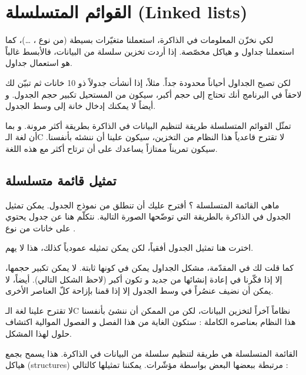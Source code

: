 \chapter{القوائم المتسلسلة (\textenglish{Linked lists})}

لكي نخزّن المعلومات في الذاكرة، استعملنا متغيّرات بسيطة (من نوع
،  \dots)،
كما استعملنا جداول و هياكل مخصّصة. إذا أردت تخزين سلسلة من البيانات، فالأبسط غالباً هو استعمال جداول. 

لكن تصبح الجداول أحياناً محدودة جداً. مثلاً، إذا أنشأت جدولاً ذو 10 خانات ثم تبيّن لك لاحقاً في البرنامج أنك تحتاج إلى حجم أكبر، سيكون من المستحيل تكبير حجم الجدول. و أيضاً لا يمكنك إدخال خانة إلى وسط الجدول.

تمثّل القوائم المتسلسلة طريقة لتنظيم البيانات في الذاكرة بطريقة أكثر مرونة. و بما أن لغة الـ\textenglish{C}
لا تقترح قاعدياً هذا النظام من التخزين، سيكون علينا أن ننشئه بأنفسنا. سيكون تمريناً ممتازاً يساعدك على أن ترتاح أكثر مع هذه اللغة.

\section{تمثيل قائمة متسلسلة}

ماهي القائمة المتسلسلة ؟ أقترح عليك أن تنطلق من نموذج الجدول. يمكن تمثيل الجدول في الذاكرة بالطريقة التي توضّحها الصورة التالية. نتكلّم هنا عن جدول يحتوي على خانات من نوع
.


\begin{information}
اخترت هنا تمثيل الجدول أفقياً، لكن يمكن تمثيله عمودياً كذلك، هذا لا يهم.
\end{information}


كما قلت لك في المقدّمة، مشكل الجداول يمكن في كونها ثابتة. لا يمكن تكبير حجمها، إلا إذا فكّرنا في إعادة إنشائها من جديد و تكون أكبر (لاحظ الشكل التالي). أيضاً، لا يمكن أن نضيف عنصُراً في وسط الجدول إلا إذا قمنا بإزاحة كلّ العناصر الأخرى.


لا تقترح علينا لغة الـ\textenglish{C}
نظاماً آخراً لتخزين البيانات، لكن من الممكن أن ننشئ بأنفسنا هذا النظام بعناصره الكاملة : ستكون الغاية من هذا الفصل و الفصول الموالية اكتشاف حلول لهذا المشكل.

القائمة المتسلسلة هي طريقة لتنظيم سلسلة من البيانات في الذاكرة. هذا يسمح بجمع هياكل
(\textenglish{structures})
مرتبطة ببعضها البعض بواسطة مؤشّرات. يمكننا تمثيلها كالتالي :

